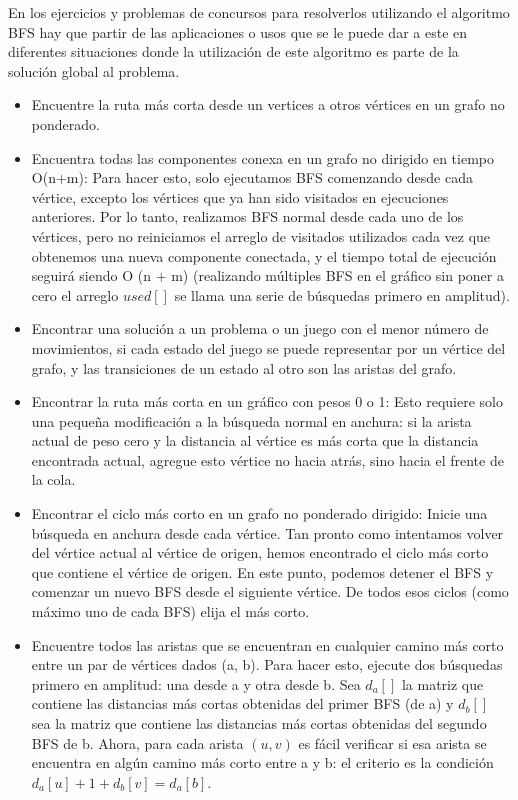 En los ejercicios y problemas de concursos para resolverlos utilizando el algoritmo BFS hay que partir de las aplicaciones o usos que se le puede dar a este en diferentes situaciones donde la utilización de este algoritmo es parte de la solución global al problema.

\begin{itemize}
	\item Encuentre la ruta más corta desde un vertices a otros vértices en un grafo no ponderado.
	\item Encuentra todas las componentes conexa en un grafo no dirigido en tiempo O(n+m): Para hacer esto, solo ejecutamos BFS comenzando desde cada vértice, excepto los vértices que ya han sido visitados en ejecuciones anteriores. Por lo tanto, realizamos BFS normal desde cada uno de los vértices, pero no reiniciamos el arreglo de visitados utilizados cada vez que obtenemos una nueva componente conectada, y el tiempo total de ejecución seguirá siendo O (n + m) (realizando múltiples BFS en el gráfico sin poner a cero el arreglo $used[]$ se llama una serie de búsquedas primero en amplitud).
	\item Encontrar una solución a un problema o un juego con el menor número de movimientos, si cada estado del juego se puede representar por un vértice del grafo, y las transiciones de un estado al otro son las aristas del grafo.
	\item Encontrar la ruta más corta en un gráfico con pesos 0 o 1: Esto requiere solo una pequeña modificación a la búsqueda normal en anchura: si la arista actual de peso cero y la distancia al vértice es más corta que la distancia encontrada actual, agregue esto vértice no hacia atrás, sino hacia el frente de la cola.
	\item Encontrar el ciclo más corto en un grafo no ponderado dirigido: Inicie una búsqueda en anchura desde cada vértice. Tan pronto como intentamos volver del vértice actual al vértice de origen, hemos encontrado el ciclo más corto que contiene el vértice de origen. En este punto, podemos detener el BFS y comenzar un nuevo BFS desde el siguiente vértice. De todos esos ciclos (como máximo uno de cada BFS) elija el más corto.
	\item Encuentre todos las aristas que se encuentran en cualquier camino más corto entre un par de vértices dados (a, b). Para hacer esto, ejecute dos búsquedas primero en amplitud: una desde a y otra desde b. Sea $d_{a}[]$ la matriz que contiene las distancias más cortas obtenidas del primer BFS (de a) y $d_{b}[]$ sea la matriz que contiene las distancias más cortas obtenidas del segundo BFS de b. Ahora, para cada arista $(u,v)$ es fácil verificar si esa arista se encuentra en algún camino más corto entre a y b: el criterio es la condición $d_{a}[u]+1+d_{b}[v]=d_{a}[b]$.

\end{itemize}
